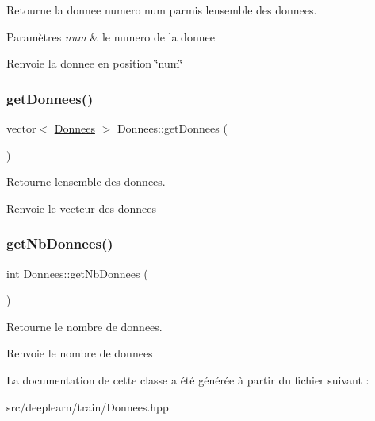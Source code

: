 Retourne la donnee numero num parmis l\textquotesingle{}ensemble des donnees. 


\begin{DoxyParams}{Paramètres}
{\em num} & le numero de la donnee \\
\hline
\end{DoxyParams}
\begin{DoxyReturn}{Renvoie}
la donnee en position \char`\"{}num\char`\"{} 
\end{DoxyReturn}
\mbox{\label{classDonnees_acb2f30978cb824d70c39b716c49fe1fa}} 
\subsubsection{\texorpdfstring{get\+Donnees()}{getDonnees()}}
{\footnotesize\ttfamily vector$<$ \hyperlink{classDonnees}{Donnees} $>$ Donnees\+::get\+Donnees (\begin{DoxyParamCaption}{ }\end{DoxyParamCaption})}



Retourne l\textquotesingle{}ensemble des donnees. 

\begin{DoxyReturn}{Renvoie}
le vecteur des donnees 
\end{DoxyReturn}
\mbox{\label{classDonnees_a4c4da37884b1b91d881524f2a7b91dbc}} 
\subsubsection{\texorpdfstring{get\+Nb\+Donnees()}{getNbDonnees()}}
{\footnotesize\ttfamily int Donnees\+::get\+Nb\+Donnees (\begin{DoxyParamCaption}{ }\end{DoxyParamCaption})}



Retourne le nombre de donnees. 

\begin{DoxyReturn}{Renvoie}
le nombre de donnees 
\end{DoxyReturn}


La documentation de cette classe a été générée à partir du fichier suivant \+:\begin{DoxyCompactItemize}
\item 
src/deeplearn/train/Donnees.\+hpp\end{DoxyCompactItemize}

